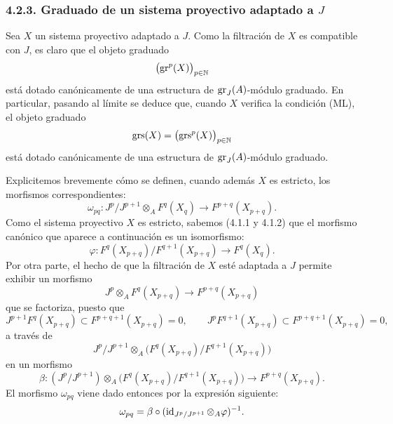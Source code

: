 \subsubsection*{4.2.3. Graduado de un sistema proyectivo adaptado a \(J\)}
Sea \(X\) un sistema proyectivo adaptado a \(J\). Como la filtración de \(X\) es compatible con \(J\), es claro que el objeto graduado
\[
\bigl(\operatorname{gr}^p(X)\bigr)_{p\in\mathbb N}
\]
está dotado canónicamente de una estructura de \(\operatorname{gr}_J(A)\)-módulo graduado. En particular, pasando al límite se deduce que, cuando \(X\) verifica la condición (ML), el objeto graduado
\[
\operatorname{grs}(X)=\bigl(\operatorname{grs}^p(X)\bigr)_{p\in\mathbb N}
\]
está dotado canónicamente de una estructura de \(\operatorname{gr}_J(A)\)-módulo graduado.

Explicitemos brevemente cómo se definen, cuando además \(X\) es estricto, los morfismos correspondientes:
\[
\omega_{pq}: J^p/J^{p+1}\otimes_A F^q(X_q)\longrightarrow F^{p+q}(X_{p+q}).
\]
Como el sistema proyectivo \(X\) es estricto, sabemos (4.1.1 y 4.1.2) que el morfismo canónico que aparece a continuación es un isomorfismo:
\[
\varphi:F^q(X_{p+q})/F^{q+1}(X_{p+q})\longrightarrow F^q(X_q).
\]
Por otra parte, el hecho de que la filtración de \(X\) esté adaptada a \(J\) permite exhibir un morfismo
\[
J^p\otimes_A F^q(X_{p+q})\longrightarrow F^{p+q}(X_{p+q})
\]
que se factoriza, puesto que
\[
J^{p+1}F^q(X_{p+q})\subset F^{p+q+1}(X_{p+q})=0,\qquad
J^pF^{q+1}(X_{p+q})\subset F^{p+q+1}(X_{p+q})=0,
\]
a través de
\[
J^p/J^{p+1}\otimes_A
\bigl(F^q(X_{p+q})/F^{q+1}(X_{p+q})\bigr)
\]
en un morfismo
\[
\beta:(J^p/J^{p+1})\otimes_A
\bigl(F^q(X_{p+q})/F^{q+1}(X_{p+q})\bigr)
\longrightarrow F^{p+q}(X_{p+q}).
\]
El morfismo \(\omega_{pq}\) viene dado entonces por la expresión siguiente:
\[
\omega_{pq}=\beta\circ(\operatorname{id}_{J^p/J^{p+1}}\otimes_A\varphi)^{-1}.
\]
